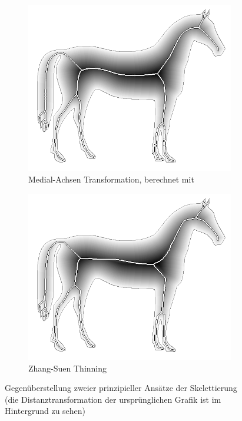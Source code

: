 \begin{figure}[ht]
    \begin{subfigure}[t]{0.48\textwidth}
        \centering
        \includegraphics[interpolate=true,width=\textwidth]{images/essentials_skeletonize_medial_axis}
        \caption{Medial-Achsen Transformation, berechnet mit~\cite{scikit-image}}
    \end{subfigure}
    \hfill
    \begin{subfigure}[t]{0.48\textwidth}
        \centering
        \includegraphics[interpolate=true,width=\textwidth]{images/essentials_skeletonize_thinning}
        \caption{Zhang-Suen Thinning~\cite{DBLP:journals/cacm/ZhangS84}}
    \end{subfigure}
    \caption[Gegenüberstellung zweier prinzipieller Ansätze der Skelettierung]{Gegenüberstellung zweier prinzipieller Ansätze der Skelettierung\\(die Distanztransformation der ursprünglichen Grafik ist im Hintergrund zu sehen)}%
    \label{fig:essentials_skeletonization_comparison}
\end{figure}

